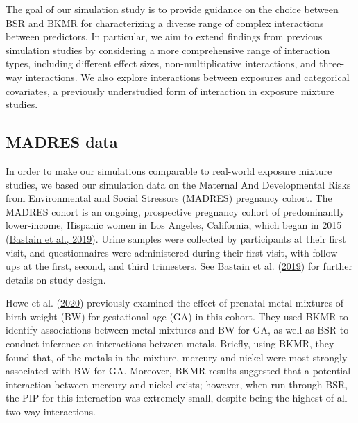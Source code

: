 \documentclass[12pt, twoside]{amherstthesis}
\begin{document}
The goal of our simulation study is to provide guidance on the choice between BSR and BKMR for characterizing a diverse range of complex interactions between predictors. In particular, we aim to extend findings from previous simulation studies by considering a more comprehensive range of interaction types, including different effect sizes, non-multiplicative interactions, and three-way interactions. We also explore interactions between exposures and categorical covariates, a previously understudied form of interaction in exposure mixture studies.

\hypertarget{madres}{%
\subsection{MADRES data}\label{madres}}

In order to make our simulations comparable to real-world exposure mixture studies, we based our simulation data on the Maternal And Developmental Risks from Environmental and Social Stressors (MADRES) pregnancy cohort. The MADRES cohort is an ongoing, prospective pregnancy cohort of predominantly lower-income, Hispanic women in Los Angeles, California, which began in 2015 (\protect\hyperlink{ref-bastain_study_2019}{Bastain et al., 2019}). Urine samples were collected by participants at their first visit, and questionnaires were administered during their first visit, with follow-ups at the first, second, and third trimesters. See Bastain et al. (\protect\hyperlink{ref-bastain_study_2019}{2019}) for further details on study design.

Howe et al. (\protect\hyperlink{ref-howe_prenatal_2020}{2020}) previously examined the effect of prenatal metal mixtures of birth weight (BW) for gestational age (GA) in this cohort. They used BKMR to identify associations between metal mixtures and BW for GA, as well as BSR to conduct inference on interactions between metals. Briefly, using BKMR, they found that, of the metals in the mixture, mercury and nickel were most strongly associated with BW for GA. Moreover, BKMR results suggested that a potential interaction between mercury and nickel exists; however, when run through BSR, the PIP for this interaction was extremely small, despite being the highest of all two-way interactions.
\end{document}
